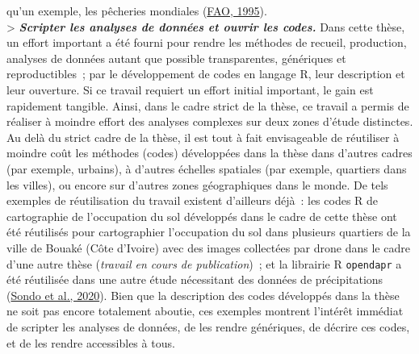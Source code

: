 \documentclass[12pt,twoside]{reedthesis}
\begin{document}
qu'un exemple, les pêcheries mondiales (\protect\hyperlink{ref-fao-cwp}{FAO, 1995}).\\

\textgreater{} \textbf{\emph{Scripter les analyses de données et ouvrir les codes.}} Dans cette thèse, un effort important a été fourni pour rendre les méthodes de recueil, production, analyses de données autant que possible transparentes, génériques et reproductibles~; par le développement de codes en langage R, leur description et leur ouverture. Si ce travail requiert un effort initial important, le gain est rapidement tangible. Ainsi, dans le cadre strict de la thèse, ce travail a permis de réaliser à moindre effort des analyses complexes sur deux zones d'étude distinctes. Au delà du strict cadre de la thèse, il est tout à fait envisageable de réutiliser à moindre coût les méthodes (codes) développées dans la thèse dans d'autres cadres (par exemple, urbains), à d'autres échelles spatiales (par exemple, quartiers dans les villes), ou encore sur d'autres zones géographiques dans le monde. De tels exemples de réutilisation du travail existent d'ailleurs déjà~: les codes R de cartographie de l'occupation du sol développés dans le cadre de cette thèse ont été réutilisés pour cartographier l'occupation du sol dans plusieurs quartiers de la ville de Bouaké (Côte d'Ivoire) avec des images collectées par drone dans le cadre d'une autre thèse (\emph{travail en cours de publication})~; et la librairie R \texttt{opendapr} a été réutilisée dans une autre étude nécessitant des données de précipitations (\protect\hyperlink{ref-sondo_determinants_2020}{Sondo et al., 2020}). Bien que la description des codes développés dans la thèse ne soit pas encore totalement aboutie, ces exemples montrent l'intérêt immédiat de scripter les analyses de données, de les rendre génériques, de décrire ces codes, et de les rendre accessibles à tous.\\
\end{document}
